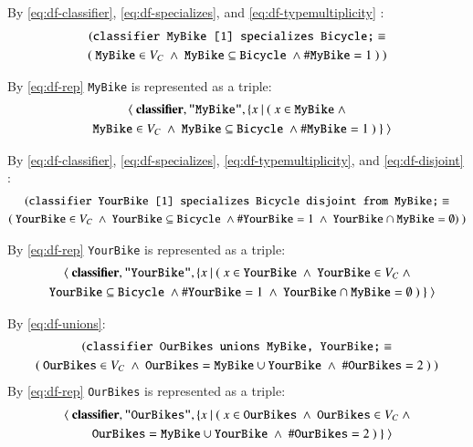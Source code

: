 By \ref{eq:df-classifier}, \ref{eq:df-specializes}, and \ref{eq:df-typemultiplicity} :
\begin{gather}
(\texttt{classifier MyBike [1] specializes Bicycle;} \equiv \notag \\
(~\texttt{MyBike}\in V_C~\wedge~ \texttt{MyBike}\subseteq\texttt{Bicycle}~\wedge \#\texttt{MyBike}=1~)~)
\end{gather}
 
By \ref{eq:df-rep} \texttt{MyBike} is represented as a triple:
\begin{gather}
\langle~\textbf{classifier},\texttt{"MyBike"},\{x~\vert ~(~ x \in \texttt{MyBike}~ \wedge \notag \\
 ~~~\texttt{MyBike}\in V_C~\wedge~ \texttt{MyBike}\subseteq\texttt{Bicycle}~\wedge \#\texttt{MyBike}=1~)~\}~\rangle
\label{eq:mybike}
\end{gather}

By \ref{eq:df-classifier}, \ref{eq:df-specializes}, \ref{eq:df-typemultiplicity}, and \ref{eq:df-disjoint} :
\begin{gather}
(\texttt{classifier YourBike [1] specializes Bicycle disjoint from MyBike;} \equiv \notag \\
(~\texttt{YourBike}\in V_C~\wedge~ \texttt{YourBike}\subseteq\texttt{Bicycle}~\wedge \#\texttt{YourBike}=1~\wedge~\texttt{YourBike}\cap\texttt{MyBike}=\emptyset)~)
\end{gather}
 
By \ref{eq:df-rep} \texttt{YourBike} is represented as a triple:
\begin{gather}
\langle~\textbf{classifier},\texttt{"YourBike"},\{x~\vert ~(~ x \in \texttt{YourBike}~\wedge~\texttt{YourBike}\in V_C~ \wedge \notag \\
 ~~~ \texttt{YourBike}\subseteq\texttt{Bicycle}~\wedge \#\texttt{YourBike}=1~\wedge~\texttt{YourBike}\cap\texttt{MyBike}=\emptyset~)~\}~\rangle
\label{eq:yourbike}
\end{gather}

By \ref{eq:df-unions}:
\begin{gather}
(\texttt{classifier OurBikes unions MyBike, YourBike;} \equiv \notag \\
(~\texttt{OurBikes}\in V_C~\wedge~ \texttt{OurBikes}=\texttt{MyBike}\cup\texttt{YourBike}~\wedge~\#\texttt{OurBikes}=2~)~)
\end{gather}
By \ref{eq:df-rep} \texttt{OurBikes} is represented as a triple:
\begin{gather}
\langle~\textbf{classifier},\texttt{"OurBikes"},\{x~\vert ~(~ x \in \texttt{OurBikes}~\wedge~\texttt{OurBikes}\in V_C~ \wedge \notag \\
 ~~~  \texttt{OurBikes}=\texttt{MyBike}\cup\texttt{YourBike}~\wedge~\#\texttt{OurBikes}=2~)~\}~\rangle
\label{eq:ourbikes}
\end{gather}

